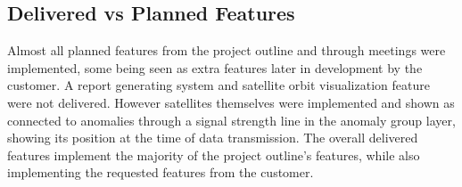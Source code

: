 
\subsection{Delivered vs Planned Features}

Almost all planned features from the project outline and through meetings were implemented, some being seen as extra features later in development by the customer. A report generating system and satellite orbit visualization feature were not delivered. However satellites themselves were implemented and shown as connected to anomalies through a signal strength line in the anomaly group layer, showing its position at the time of data transmission. The overall delivered features implement the majority of the project outline's features, while also implementing the requested features from the customer.

